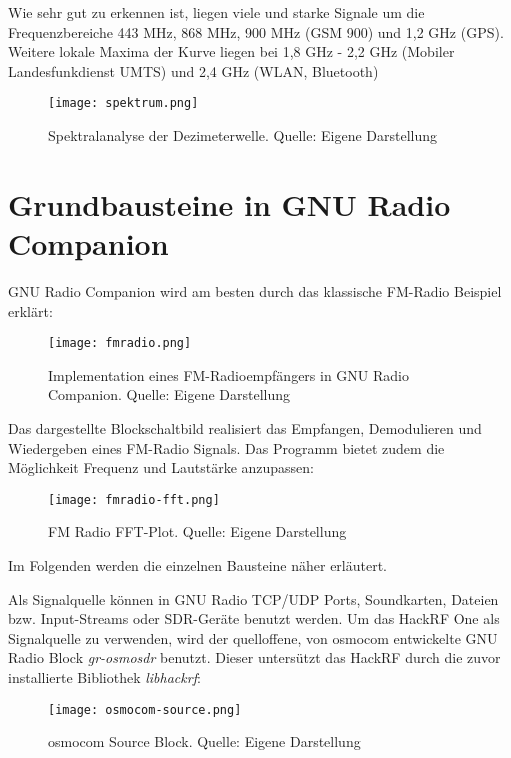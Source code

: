 Wie sehr gut zu erkennen ist, liegen viele und starke Signale um die Frequenzbereiche 443 MHz, 868 MHz, 900 MHz (GSM 900) und 1,2 GHz (GPS). Weitere lokale Maxima der Kurve liegen bei 1,8 GHz - 2,2 GHz (Mobiler Landesfunkdienst UMTS) und 2,4 GHz (WLAN, Bluetooth)
\begin{figure}[H]
	\centering
	\texttt{[image: spektrum.png]}
	\caption[Spektralanalyse der Dezimeterwelle]{Spektralanalyse der Dezimeterwelle. Quelle: Eigene Darstellung} 
	\label{spektralanalyse}
\end{figure}
\newpage

\section{Grundbausteine in GNU Radio Companion}
GNU Radio Companion wird am besten durch das klassische FM-Radio Beispiel erklärt:

\begin{figure}[ht]
	\centering
	\texttt{[image: fmradio.png]}
	\caption[Implementation eines FM-Radioempfängers in GNU Radio Companion]{Implementation eines FM-Radioempfängers in GNU Radio Companion. Quelle: Eigene Darstellung} 
	\label{fmradio}
\end{figure}

Das dargestellte Blockschaltbild realisiert das Empfangen, Demodulieren und Wiedergeben eines FM-Radio Signals. Das Programm bietet zudem die Möglichkeit Frequenz und Lautstärke anzupassen:

\begin{figure}[ht]
	\centering
	\texttt{[image: fmradio-fft.png]}
	\caption[FM Radio FFT-Plot]{FM Radio FFT-Plot. Quelle: Eigene Darstellung} 
	\label{fmradio-fft}
\end{figure}

Im Folgenden werden die einzelnen Bausteine näher erläutert.


\newpage
Als Signalquelle können in GNU Radio TCP/UDP Ports, Soundkarten, Dateien bzw. Input-Streams oder \ac{SDR}-Geräte benutzt werden.\newline
Um das HackRF One als Signalquelle zu verwenden, wird der quelloffene, von \ac{osmocom} \cite{osmocom:2018} entwickelte GNU Radio Block \textit{gr-osmosdr} \cite{gr-osmosdr:2018} benutzt.
Dieser untersützt das HackRF durch die zuvor installierte Bibliothek \textit{libhackrf}:

\begin{figure}[ht]
	\centering
	\texttt{[image: osmocom-source.png]}
	\caption[osmocom Source Block]{osmocom Source Block. Quelle: Eigene Darstellung} 
	\label{osmocom-source}
\end{figure}

